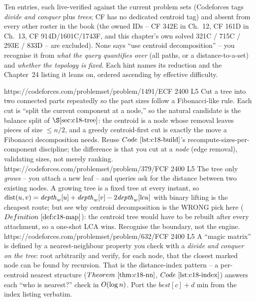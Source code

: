 Ten entries, each live-verified against the current problem sets (Codeforces tags
\emph{divide and conquer} plus \emph{trees}; CF has no dedicated centroid tag) and absent from
every other roster in the book (the owned IDs -- CF 342E in Ch.~12, CF 161D in Ch.~13, CF
914D/1601C/1743F, and this chapter's own solved 321C / 715C / 293E / 833D -- are excluded). None
says ``use centroid decomposition'' -- you recognise it from \emph{what the query quantifies over}
(all paths, or a distance-to-a-set) and \emph{whether the topology is fixed}. Each hint names its
reduction and the Chapter~24 listing it leans on, ordered ascending by effective difficulty.

\begin{mixedset}
    {https://codeforces.com/problemset/problem/1491/E}{CF 2400 L5}
    {Cut a tree into two connected parts repeatedly so the part sizes follow a Fibonacci-like
     rule. Each cut is ``split the current component at a node,'' so the natural candidate is the
     balance split of \(\secref{c18-tree}\): the centroid is a node whose removal leaves pieces of
     size \(\le n/2\), and a greedy centroid-first cut is exactly the move a Fibonacci decomposition
     needs. Reuse \(\coderef{c18-build}\)'s recompute-sizes-per-component discipline; the difference
     is that you cut at a \emph{node} (edge removal), validating sizes, not merely ranking.}
    {https://codeforces.com/problemset/problem/379/F}{CF 2400 L5}
    {The tree only \emph{grows} -- you attach a new leaf -- and queries ask for the distance between
     two existing nodes. A growing tree is a fixed tree at every instant, so \(\operatorname{dist}(u,v)=
     \mathit{depth}_w[u]+\mathit{depth}_w[v]-2\mathit{depth}_w[\mathrm{lca}]\) with binary lifting is
     the cheapest route; but see why centroid decomposition is the WRONG pick here
     (\(\defref{c18-map}\)): the centroid tree would have to be rebuilt after every attachment, so a
     one-shot LCA wins. Recognise the boundary, not the engine.}
    {https://codeforces.com/problemset/problem/632/F}{CF 2400 L5}
    {A ``magic matrix'' is defined by a nearest-neighbour property you check with a \emph{divide and
     conquer on the tree}: root arbitrarily and verify, for each node, that the closest marked node
     can be found by recursion. That is the distance-index pattern -- a per-centroid nearest
     structure (\(\thmref{c18-nn}\), \(\coderef{c18-index}\)) answers each ``who is nearest?'' check
     in \(O(\log n)\). Port the \(\mathit{best}[c]+d\) min from the index listing verbatim.}

\end{mixedset}
